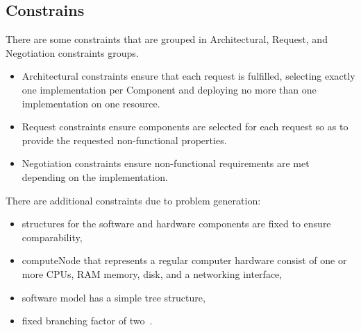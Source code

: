\subsection{Constrains}
There are some constraints that are grouped in Architectural, Request, and Negotiation constraints groups.
\begin{itemize}
	\item Architectural constraints ensure that each request is fulfilled, selecting exactly one implementation per Component and deploying no more than one implementation on one resource.
	\item Request constraints ensure components are selected for each request so as to provide the requested non-functional properties.
	\item Negotiation constraints ensure non-functional requirements are met depending on the implementation.
\end{itemize}
There are additional constraints due to problem generation:
\begin{itemize}
	\item structures for the software and hardware components are fixed to ensure comparability,
	\item computeNode that represents a regular computer hardware consist of one or more CPUs, RAM memory, disk, and a networking interface,
	\item software model has a simple tree structure,
	\item  fixed branching factor of two~\cite{gotz18}.
\end{itemize}


